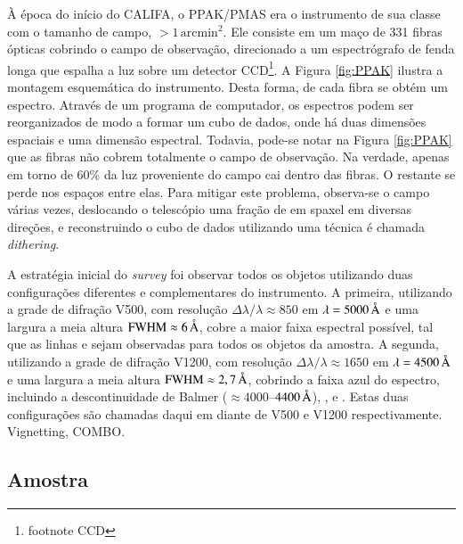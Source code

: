 À época do início do CALIFA, o PPAK/PMAS era o instrumento de sua classe com o
tamanho de campo, $>1\,\mathrm{arcmin}^2$. Ele consiste em um maço de 331 fibras
ópticas cobrindo o campo de observação, direcionado a um espectrógrafo de fenda
longa que espalha a luz sobre um detector CCD\footnote{\TODO footnote CCD}. A
Figura \ref{fig:PPAK} ilustra a montagem esquemática do instrumento.
Desta forma, de cada fibra se obtém um espectro. Através de um programa de
computador, os espectros podem ser reorganizados de modo a formar um cubo de
dados, onde há duas dimensões espaciais e uma dimensão espectral. Todavia,
pode-se notar na Figura \ref{fig:PPAK} que as fibras não cobrem totalmente o
campo de observação. Na verdade, apenas em torno de 60\% da luz proveniente do
campo cai dentro das fibras. O restante se perde nos espaços entre elas. Para
mitigar este problema, observa-se o campo várias vezes, deslocando o telescópio
uma fração de {em spaxel} em diversas direções, e reconstruindo o cubo de dados
utilizando uma técnica é chamada {\em dithering}.

A estratégia inicial do {\em survey} foi observar todos os objetos utilizando
duas configurações diferentes e complementares do instrumento. A primeira,
utilizando a grade de difração V500, com resolução $\Delta \lambda / \lambda
\approx 850$ em $\lambda = 5000\,\text{\normalfont\AA}$ e uma largura a meia altura
$\mathrm{FWHM} \approx 6\,\text{\normalfont\AA}$, cobre a maior faixa espectral possível,
tal que as linhas \OII e \SII sejam observadas para todos os objetos da amostra.
A segunda, utilizando a grade de difração V1200, com resolução $\Delta \lambda /
\lambda \approx 1650$ em $\lambda = 4500\,\text{\normalfont\AA}$ e uma largura a meia altura
$\mathrm{FWHM} \approx 2,7\,\text{\normalfont\AA}$, cobrindo a faixa azul do espectro,
incluindo a descontinuidade de Balmer ($\approx 4000$--$4400\,\text{\normalfont\AA}$),
\Hdelta, \Hgamma e . Estas duas configurações são chamadas daqui em
diante de V500 e V1200 respectivamente. \TODO Vignetting, COMBO.

\subsection{Amostra}

